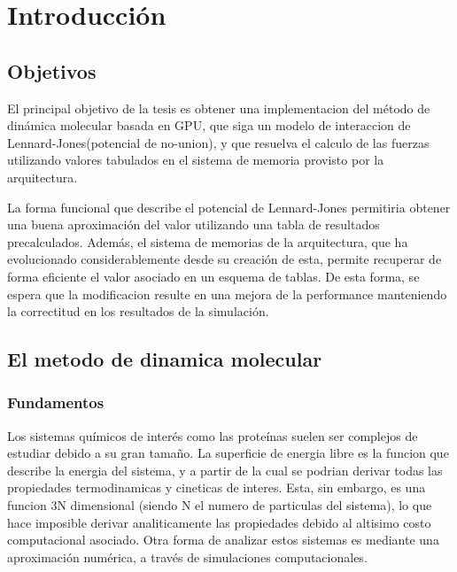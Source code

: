 \documentclass[a4paper,10pt]{report}
\begin{document}
\pagebreak




\tableofcontents

\pagebreak


\chapter{Introducción}


\section{Objetivos}



El principal objetivo de la tesis es obtener una implementacion del método de dinámica molecular basada en GPU, que siga un modelo de interaccion de 
Lennard-Jones(potencial de no-union), y que resuelva el calculo de las fuerzas utilizando valores tabulados en el sistema de memoria provisto por la arquitectura. 

La forma funcional que describe el potencial de Lennard-Jones permitiria obtener una buena aproximación del valor utilizando una tabla de resultados precalculados. 
Además, el sistema de memorias de la arquitectura, que ha evolucionado considerablemente desde su creación de esta, permite recuperar de forma eficiente el valor asociado en un esquema de tablas. 
De esta forma, se espera que la modificacion resulte en una mejora de la performance manteniendo la correctitud en los resultados de la simulación. 



\section{El metodo de dinamica molecular}

\subsection{Fundamentos}


Los sistemas químicos de interés como las proteínas suelen ser complejos de estudiar debido a su gran tamaño. 
La superficie de energia libre es la funcion que describe la energia del sistema, y a partir de la cual se podrian
derivar todas las propiedades termodinamicas y cineticas de interes. Esta, sin embargo, es una funcion 3N dimensional (siendo N el numero de particulas del sistema), lo que hace imposible derivar analiticamente las propiedades debido al altisimo costo computacional asociado.
Otra forma de analizar estos sistemas es mediante una aproximación numérica, a través de simulaciones computacionales.  	
\end{document}
